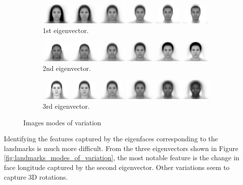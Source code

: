 \documentclass{article}
\begin{document}
\begin{figure}[H]
    \centering

    \begin{subfigure}[b]{0.8\textwidth}
        \centering
        \includegraphics[width=\linewidth]{images/mv_image_eigenvector_0.jpg}
        \caption{1st eigenvector.}
        \label{fig:mv_eigenvector1_image}
    \end{subfigure}


    \begin{subfigure}[b]{0.8\textwidth}
        \centering
        \includegraphics[width=\linewidth]{images/mv_image_eigenvector_1.jpg}
        \caption{2nd eigenvector.}
        \label{fig:mv_eigenvector2_image}
    \end{subfigure}


    \begin{subfigure}[b]{0.8\textwidth}
        \centering
        \includegraphics[width=\linewidth]{images/mv_image_eigenvector_2.jpg}
        \caption{3rd eigenvector.}
        \label{fig:mv_eigenvector3_image}
    \end{subfigure}

    \caption{Images modes of variation}
    \label{fig:images_modes_of_variation}
\end{figure}

Identifying the features captured by the eigenfaces corresponding to the landmarks is much more difficult. From the three eigenvectors shown in Figure \ref{fig:landmarks_modes_of_variation}, the most notable feature is the change in face longitude captured by the second eigenvector. Other variations seem to capture 3D rotations.
\end{document}
